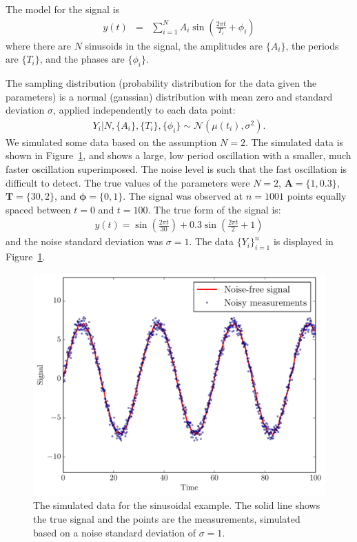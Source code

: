 \documentclass[letterpaper, 11pt]{article}
\begin{document}
The model for the signal is
\begin{eqnarray}
y(t) &=& \sum_{i=1}^N A_i \sin \left(\frac{2\pi t}{T_i} + \phi_i\right)
\end{eqnarray}
where there are $N$ sinusoids in the signal, the
amplitudes are $\{A_i\}$, the periods are $\{T_i\}$, and the phases are
$\{\phi_i\}$.

The sampling distribution (probability distribution for the data given the
parameters) is a normal (gaussian) distribution with mean zero and standard
deviation $\sigma$, applied independently to each data point:
\begin{eqnarray}
Y_i | N, \{A_i\}, \{T_i\}, \{\phi_i\} \sim
\mathcal{N}\left(\mu(t_i), \sigma^2\right).
\end{eqnarray}
We simulated some data based on the assumption $N=2$.
The simulated data is shown in Figure~\ref{fig:sinewave_data}, and shows a
large, low period oscillation with a smaller, much faster oscillation
superimposed. The noise level is such that the fast oscillation is difficult
to detect. The true values of the parameters were
$N=2$, $\mathbf{A} = \{1, 0.3\}$,
$\mathbf{T}=\{30, 2\}$, and $\boldsymbol{\phi} = \{0, 1\}$. The signal was
observed at $n=1001$ points equally spaced between $t=0$ and $t=100$.
The true form of the signal is:
\begin{eqnarray}
y(t) = \sin\left(\frac{2\pi t}{30}\right) +
0.3 \sin\left(\frac{2\pi t}{2} + 1\right)
\end{eqnarray}
and the noise standard deviation was $\sigma = 1$. The data $\{Y_i\}_{i=1}^n$
is displayed in Figure~\ref{fig:sinewave_data}.

\begin{figure}
\begin{center}
\includegraphics[scale=0.5]{sinewave_data.pdf}
\caption{The simulated data for the sinusoidal example. The solid line shows
the true signal and the points are the measurements, simulated based on a
noise standard deviation of $\sigma = 1$.
\label{fig:sinewave_data}}
\end{center}
\end{figure}
\end{document}
